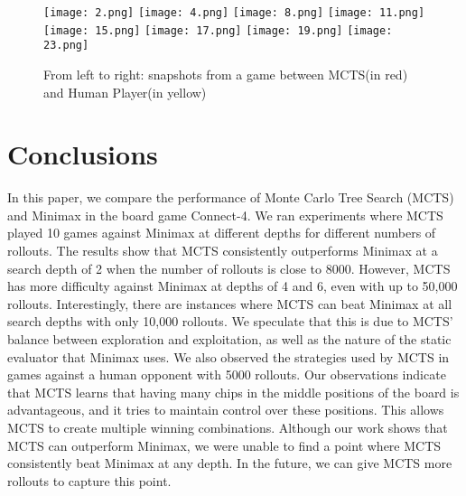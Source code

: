 \documentclass[11pt]{article}
\begin{document}
\FloatBarrier
\begin{center}
  \begin{figure}[h]
      \texttt{[image: 2.png]}
      \texttt{[image: 4.png]}
      \texttt{[image: 8.png]}
      \texttt{[image: 11.png]}
      \texttt{[image: 15.png]}
      \texttt{[image: 17.png]}
      \texttt{[image: 19.png]}
      \texttt{[image: 23.png]}
    \caption{From left to right: snapshots from a game between MCTS(in red) and Human Player(in yellow)}
    \label{game snapshots}
  \end{figure}
\end{center}
\FloatBarrier

\section{Conclusions}
In this paper, we compare the performance of Monte Carlo Tree Search (MCTS) and Minimax in 
the board game Connect-4. We ran experiments where MCTS played 10 games against Minimax at different 
depths for different numbers of rollouts. The results show that MCTS consistently outperforms Minimax 
at a search depth of 2 when the number of rollouts is close to 8000. However, MCTS has more difficulty 
against Minimax at depths of 4 and 6, even with up to 50,000 rollouts. Interestingly, there are instances 
where MCTS can beat Minimax at all search depths with only 10,000 rollouts. We speculate that this is 
due to MCTS' balance between exploration and exploitation, as well as the nature of the static evaluator 
that Minimax uses. We also observed the strategies used by MCTS in games against a human opponent with 5000 
rollouts. Our observations indicate that MCTS learns that having many chips in the middle positions 
of the board is advantageous, and it tries to maintain control over these positions. 
This allows MCTS to create multiple winning combinations. 
Although our work shows that MCTS can outperform Minimax, we were unable to find a point where MCTS 
consistently beat Minimax at any depth. In the future, we can give MCTS more rollouts to capture this point.



\end{document}
